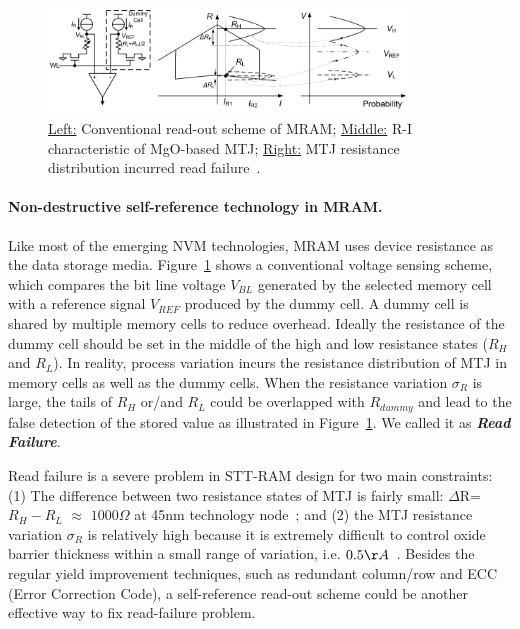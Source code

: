 \begin{figure}
\centering
\vspace{-10pt}
\includegraphics[width=0.85\textwidth]{./figure/5_selfref.pdf}
\vspace{-10pt}
\caption{\underline{Left:} Conventional read-out scheme of MRAM; \underline{Middle:} R-I characteristic of MgO-based MTJ; \underline{Right:} MTJ resistance distribution incurred read failure~\cite{Li09}.}
\label{selfref}
\vspace{-10pt}
\end{figure}

\paragraph{Non-destructive self-reference technology in MRAM.} Like most of the emerging NVM technologies, MRAM uses device resistance as the data storage media. Figure~\ref{selfref} shows a conventional voltage sensing scheme, which compares the bit line voltage $V_{BL}$ generated by the selected memory cell with a reference signal $V_{REF}$ produced by the dummy cell. A dummy cell is shared by multiple memory cells to reduce overhead. Ideally the resistance of the dummy cell should be set in the middle of the high and low resistance states ($R_H$ and $R_L$). In reality, process variation incurs the resistance distribution of MTJ in memory cells as well as the dummy cells. When the resistance variation $\sigma_R$ is large, the tails of $R_H$ or/and $R_L$ could be overlapped with $R_{dummy}$ and lead to the false detection of the stored value as illustrated in Figure~\ref{selfref}. We called it as \textbf{\emph{Read Failure}}.

Read failure is a severe problem in STT-RAM design for two main constraints: (1) The difference between two resistance states of MTJ is fairly small: $\Delta$R=$R_H-R_L$ $\approx$ $1000\Omega$ at 45nm technology node~\cite{Li09}; and (2) the MTJ resistance variation $\sigma_R$ is relatively high because it is extremely difficult to control oxide barrier thickness within a small range of variation, i.e. $0.5{\AA}$~\cite{Jeong03}. Besides the regular yield improvement techniques, such as redundant column/row and ECC (Error Correction Code), a self-reference read-out scheme could be another effective way to fix read-failure problem.

